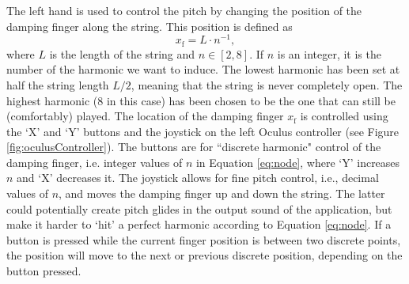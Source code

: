 \documentclass{article}
\begin{document}
The left hand is used to control the pitch by changing the position of the damping finger along the string. This position is defined as  
\begin{equation}\label{eq:node}
    x_\text{f} = L\cdot n^{-1},
\end{equation}
where $L$ is the length of the string and $n \in [2,8]$. If $n$ is an integer, it is the number of the harmonic we want to induce. The lowest harmonic has been set at half the string length $L/2$, meaning that the string is never completely open. The highest harmonic (8 in this case) has been chosen to be the one that can still be (comfortably) played. The location of the damping finger $x_\text{f}$ is controlled using the `X' and `Y' buttons and the joystick on the left Oculus controller (see Figure \ref{fig:oculusController}). The buttons are for ``discrete harmonic" control of the damping finger, i.e. integer values of $n$ in Equation \eqref{eq:node}, where `Y' increases $n$ and `X' decreases it. The joystick allows for fine pitch control, i.e., decimal values of $n$,  and moves the damping finger up and down the string. The latter could potentially create pitch glides in the output sound of the application, but make it harder to `hit' a perfect harmonic according to Equation \eqref{eq:node}. If a button is pressed while the current finger position is between two discrete points, the position will move to the next or previous discrete position, depending on the button pressed.
\end{document}
